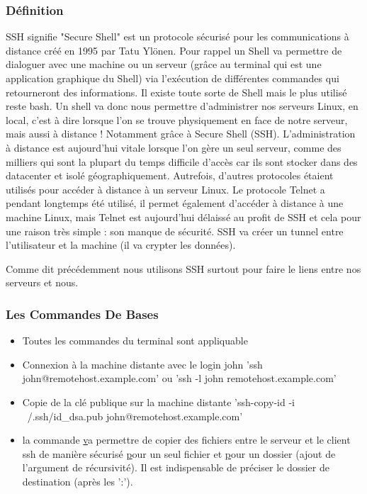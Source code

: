\subsubsection{Définition}

SSH signifie "Secure Shell" est un protocole sécurisé pour les communications à distance créé en 1995 par Tatu Ylönen. Pour rappel un Shell va permettre de dialoguer avec une machine ou un serveur (grâce au terminal qui est une application graphique du Shell) via l'exécution de différentes commandes qui retourneront des informations. Il existe toute sorte de Shell mais le plus utilisé reste bash.
Un shell va donc nous permettre d'administrer nos serveurs Linux, en local, c'est à dire lorsque l'on se trouve physiquement en face de notre serveur, mais aussi à distance ! Notamment grâce à Secure Shell (SSH).
L'administration à distance est aujourd'hui vitale lorsque l'on gère un seul serveur, comme des milliers qui sont la plupart du temps difficile d'accès car ils sont stocker dans des datacenter et isolé géographiquement.
Autrefois, d'autres protocoles étaient utilisés pour accéder à distance à un serveur Linux. Le protocole Telnet a pendant longtemps été utilisé, il permet également d'accéder à distance à une machine Linux, mais Telnet est aujourd'hui délaissé au profit de SSH et cela pour une raison très simple : son manque de sécurité. SSH va créer un tunnel entre l'utilisateur et la machine (il va crypter les données).

Comme dit précédemment nous utilisons SSH surtout pour faire le liens entre nos serveurs et nous.

\subsubsection{Les Commandes De Bases}
\begin{itemize}
	\item Toutes les commandes du terminal sont appliquable
	\item Connexion à la machine distante avec le login john 'ssh john@remotehost.example.com' ou 'ssh -l john remotehost.example.com'
	\item Copie de la clé publique sur la machine distante 'ssh-copy-id -i ~/.ssh/id_dsa.pub john@remotehost.example.com'
	\item la commande \href{scp} va permettre de copier des fichiers entre le serveur et le client ssh de manière sécurisé \href{scp my_file john@remotehost.example.com:/home/john/a_folder} pour un seul fichier et \href{scp -r my_folder john@remotehost.example.com:/home/john/another_folder} pour un dossier (ajout de l’argument de récursivité). Il est indispensable de préciser le dossier de destination (après les ':').
\end{itemize}
